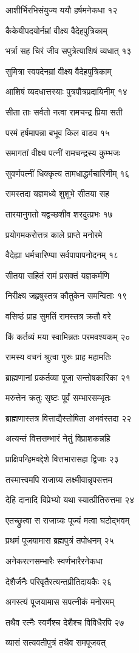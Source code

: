 आशीर्भिरभिसंयुज्य ययौ हर्षमनेकधा १२

कैकेयीपदयोर्नम्रां वीक्ष्य वैदेहपुत्रिकाम्

भर्त्रा सह चिरं जीव सपुत्रेत्याशिषं व्यधात् १३

सुमित्रा स्वपदेनम्रां वीक्ष्य वैदेहपुत्रिकाम्

आशिषं व्यदधात्तस्याः पुत्रपौत्रप्रदायिनीम् १४

सीता ताः सर्वतो नत्वा रामचन्द्र प्रिया सती

परमं हर्षमापन्ना बभूव किल वाडव १५

समागतां वीक्ष्य पत्नीं रामचन्द्रस्य कुम्भजः

सुवर्णपत्नीं धिक्कृत्य तामधाद्धर्मचारिणीम् १६

रामस्तदा यज्ञमध्ये शुशुभे सीतया सह

तारयानुगतो यद्वच्छशीव शरदुत्प्रभः १७

प्रयोगमकरोत्तत्र काले प्राप्ते मनोरमे

वैदेह्या धर्मचारिण्या सर्वपापापनोदनम् १८

सीतया सहितं रामं प्रसक्तं यज्ञकर्मणि

निरीक्ष्य जहृषुस्तत्र कौतुकेन समन्विताः १९

वसिष्ठं प्राह सुमतिं रामस्तत्र क्रतौ वरे

किं कर्तव्यं मया स्वामिन्नतः परमवश्यकम् २०

रामस्य वचनं श्रुत्वा गुरुः प्राह महामतिः

ब्राह्मणानां प्रकर्तव्या पूजा सन्तोषकारिका २१

मरुत्तेन क्रतुः सृष्टः पूर्वं सम्भारसम्भृतः

ब्राह्मणास्तत्र वित्ताद्यैस्तोषिता अभवंस्तदा २२

अत्यन्तं वित्तसम्भारं नेतुं विप्राशकन्नहि

प्राक्षिपन्हिमवद्देशे वित्तभारासहा द्विजाः २३

तस्मात्त्वमपि राजाग्र्य लक्ष्मीवान्नृपसत्तम

देहि दानादि विप्रेभ्यो यथा स्यात्प्रीतिरुत्तमा २४

एतच्छ्रुत्वा स राजाग्र्यः पूज्यं मत्वा घटोद्भवम्

प्रथमं पूजयामास ब्रह्मपुत्रं तपोधनम् २५

अनेकरत्नसम्भारैः स्वर्णभारैरनेकधा

देशैर्जनैः परिवृतैरत्यन्तप्रीतिदायकैः २६

अगस्त्यं पूजयामास सपत्नीकं मनोरमम्

तथैव रत्नैः स्वर्णैश्च देशैश्च विविधैरपि २७

व्यासं सत्यवतीपुत्रं तथैव समपूजयत्

